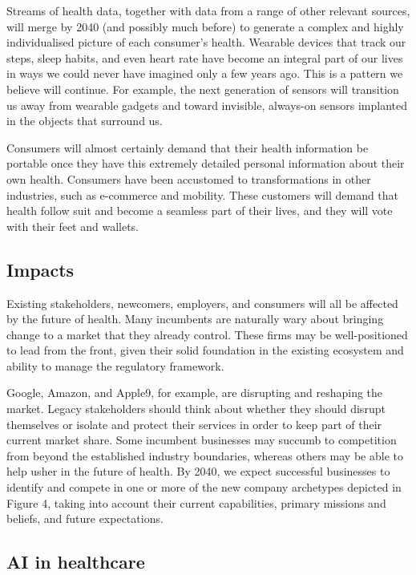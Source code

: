 \documentclass[12pt]{article}
\begin{document}
Streams of health data, together with data from a range of other relevant sources, will merge by 2040 (and possibly much before) to generate a complex and highly individualised picture of each consumer's health. Wearable devices that track our steps, sleep habits, and even heart rate have become an integral part of our lives in ways we could never have imagined only a few years ago. This is a pattern we believe will continue. For example, the next generation of sensors will transition us away from wearable gadgets and toward invisible, always-on sensors implanted in the objects that surround us.

Consumers will almost certainly demand that their health information be portable once they have this extremely detailed personal information about their own health. Consumers have been accustomed to transformations in other industries, such as e-commerce and mobility. These customers will demand that health follow suit and become a seamless part of their lives, and they will vote with their feet and wallets.

\subsection{Impacts}

Existing stakeholders, newcomers, employers, and consumers will all be affected by the future of health. Many incumbents are naturally wary about bringing change to a market that they already control. These firms may be well-positioned to lead from the front, given their solid foundation in the existing ecosystem and ability to manage the regulatory framework.

Google, Amazon, and Apple9, for example, are disrupting and reshaping the market. Legacy stakeholders should think about whether they should disrupt themselves or isolate and protect their services in order to keep part of their current market share. Some incumbent businesses may succumb to competition from beyond the established industry boundaries, whereas others may be able to help usher in the future of health.
By 2040, we expect successful businesses to identify and compete in one or more of the new company archetypes depicted in Figure 4, taking into account their current capabilities, primary missions and beliefs, and future expectations.

\subsection{AI in healthcare}
\end{document}
